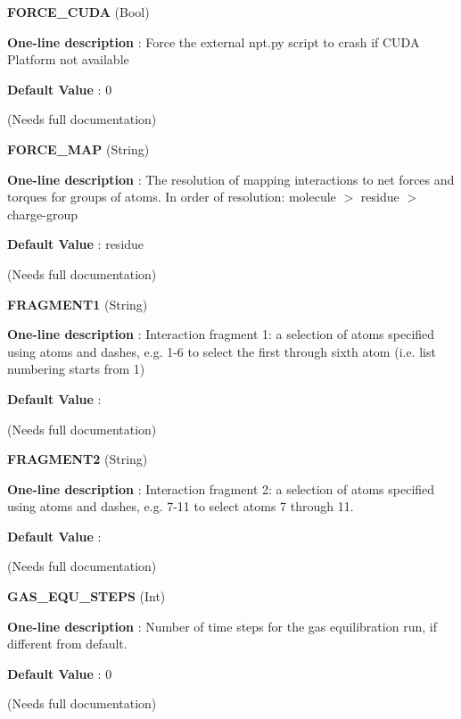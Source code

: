\begin{DoxyItemize}
\item {\bfseries  \-F\-O\-R\-C\-E\-\_\-\-C\-U\-D\-A } (\-Bool) \par
{\bfseries  \-One-\/line description }\-: \-Force the external npt.\-py script to crash if \-C\-U\-D\-A \-Platform not available \par
{\bfseries  \-Default \-Value }\-: 0 \par
(\-Needs full documentation)\end{DoxyItemize}
\begin{DoxyItemize}
\item {\bfseries  \-F\-O\-R\-C\-E\-\_\-\-M\-A\-P } (\-String) \par
{\bfseries  \-One-\/line description }\-: \-The resolution of mapping interactions to net forces and torques for groups of atoms. \-In order of resolution\-: molecule $>$ residue $>$ charge-\/group \par
{\bfseries  \-Default \-Value }\-: residue \par
(\-Needs full documentation)\end{DoxyItemize}
\begin{DoxyItemize}
\item {\bfseries  \-F\-R\-A\-G\-M\-E\-N\-T1 } (\-String) \par
{\bfseries  \-One-\/line description }\-: \-Interaction fragment 1\-: a selection of atoms specified using atoms and dashes, e.\-g. 1-\/6 to select the first through sixth atom (i.\-e. list numbering starts from 1) \par
{\bfseries  \-Default \-Value }\-: \par
(\-Needs full documentation)\end{DoxyItemize}
\begin{DoxyItemize}
\item {\bfseries  \-F\-R\-A\-G\-M\-E\-N\-T2 } (\-String) \par
{\bfseries  \-One-\/line description }\-: \-Interaction fragment 2\-: a selection of atoms specified using atoms and dashes, e.\-g. 7-\/11 to select atoms 7 through 11. \par
{\bfseries  \-Default \-Value }\-: \par
(\-Needs full documentation)\end{DoxyItemize}
\begin{DoxyItemize}
\item {\bfseries  \-G\-A\-S\-\_\-\-E\-Q\-U\-\_\-\-S\-T\-E\-P\-S } (\-Int) \par
{\bfseries  \-One-\/line description }\-: \-Number of time steps for the gas equilibration run, if different from default. \par
{\bfseries  \-Default \-Value }\-: 0 \par
(\-Needs full documentation)\end{DoxyItemize}
